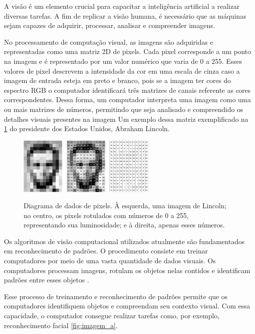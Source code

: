 A visão é um elemento crucial para capacitar a inteligência artificial a realizar diversas tarefas. A fim de replicar a visão humana, é necessário que as máquinas sejam capazes de adquirir, processar, analisar e compreender imagens. \cite{como_funciona_visao_computacional}



No processamento de computação visual, as imagens são adquiridas e representadas como uma matriz 2D de pixels. Cada pixel corresponde a um ponto na imagem e é representado por um valor numérico que varia de 0 a 255. Esses valores de pixel descrevem a intensidade da cor em uma escala de cinza caso a imagem de entrada esteja em preto e branco, pois se a imagem ter cores do espectro RGB o computador identificará três matrizes de canais referente as cores correspondentes. Dessa forma, um computador interpreta uma imagem como uma ou mais matrizes de números, permitindo que seja analisado e compreendido os detalhes visuais presentes na imagem Um exemplo dessa matriz exemplificado na \cref{fig:comp_vision} do presidente dos Estados Unidos, Abraham Lincoln\cite{mit_video}.

\begin{figure}[ht]
	\caption{Diagrama de dados de pixels. À esquerda, uma imagem de Lincoln; no centro, os pixels rotulados com números de 0 a 255, representando sua luminosidade; e à direita, apenas esses números.}
	\centering
	\includegraphics[width=0.6\textwidth]{figures/lincoln_pixel_values.png}
  \label{fig:comp_vision}
\end{figure}

Os algoritmos de visão computacional utilizados atualmente são fundamentados em reconhecimento de padrões. O procedimento consiste em treinar computadores por meio de uma vasta quantidade de dados visuais. Os computadores processam imagens, rotulam os objetos nelas contidos e identificam padrões entre esses objetos \cite{content_Human_Vision}.

Esse processo de treinamento e reconhecimento de padrões permite que os computadores identifiquem objetos e compreendam seu contexto visual. Com essa capacidade, o computador consegue realizar tarefas como, por exemplo, reconhecimento facial \cref{fig:imagem_a}.



